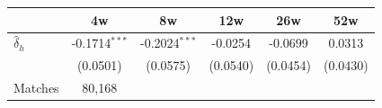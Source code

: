 \begin{tabular}{l*{5}{c}}
\toprule
 & 4w & 8w & 12w & 26w & 52w \\
\midrule
$\hat{\delta}_h$ & -0.1714$^{***}$ & -0.2024$^{***}$ & -0.0254 & -0.0699 & 0.0313 \\
 & (0.0501) & (0.0575) & (0.0540) & (0.0454) & (0.0430) \\
\midrule
Matches & 80,168 \\
\bottomrule
\end{tabular}
